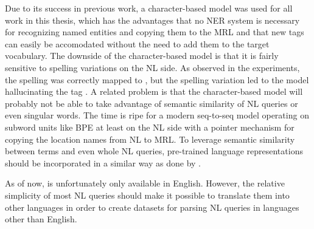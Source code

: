 Due to its success in previous work, a character-based model was used for all
work in this thesis, which has the advantages that no NER system is necessary
for recognizing named entities and copying them to the MRL and that new tags can
easily be accomodated without the need to add them to the target vocabulary. The
downside of the character-based model is that it is fairly sensitive to spelling
variations on the NL side. As observed in the experiments, the spelling  was correctly mapped to , but the
spelling variation  led to the model hallucinating the tag
. A related problem is that the character-based
model will probably not be able to take advantage of semantic similarity of NL
queries or even singular words. The time is ripe for a modern seq-to-seq model
operating on subword units like BPE at least on the NL side with a pointer
mechanism \parencite{see-2017} for copying the location names from NL to MRL. To
leverage semantic similarity between terms and even whole NL queries,
pre-trained language representations should be incorporated in a similar way as
done by \textcite{chen-2020}.

As of now, \nlmaps{} is unfortunately only available in English. However, the
relative simplicity of most NL queries should make it possible to translate them
into other languages in order to create datasets for parsing NL queries in
languages other than English.

